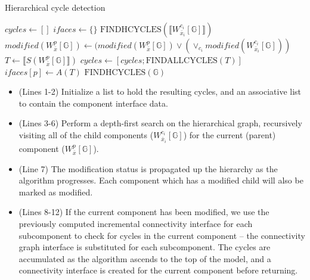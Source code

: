 \begin{algorithm}[H]
\caption{Hierarchical cycle detection}
\label{alg:hcycles}
\begin{algorithmic}[1]
\State $cycles \gets [ ]$
\State $ifaces \gets \{ \}$
      \State ${\scriptstyle \mathrm{FINDHCYCLES}}( \llbracket W_{\bar{x}_i}^{c_i} [\mathbb{G}] \rrbracket )$
   \EndFor
   \State $modified( W_{\bar{x}}^p [\mathbb{G}]) \gets (modified( W_{\bar{x}}^p [\mathbb{G}]) \vee ( \vee_{c_i} modified( W_{\bar{x}_i}^{c_i} [\mathbb{G}] ) )$
      \State $T \gets \llbracket S(W_{\bar{x}}^p [\mathbb{G}] \rrbracket )$
      \State $cycles \gets [ cycles; {\scriptstyle \mathrm{FINDALLCYCLES}}( T ) ]$
      \State $ifaces[p] \gets A(T)$
   \EndIf
\EndFunction
\State ${\scriptstyle \mathrm{FINDHCYCLES}}( \mathbb{G}) $
\end{algorithmic}
\end{algorithm}

\begin{itemize}
\item (Lines 1-2) Initialize a list to hold the resulting cycles, and an associative list to contain the component interface data.
\item (Lines 3-6) Perform a depth-first search on the hierarchical graph, recursively visiting all of the child components ($W_{\bar{x}_i}^{c_i} [\mathbb{G}]$)  for the current (parent) component ($W_{\bar{x}}^p [\mathbb{G}]$).
\item (Line 7)  The modification status is propagated up the hierarchy as the algorithm progresses.  Each component which has a modified child will also be marked as modified.
\item (Lines 8-12) If the current component has been modified, we use the previously computed incremental connectivity interface for each subcomponent to check for cycles in the current component -- the connectivity graph interface is substituted for each subcomponent.  The cycles are accumulated as the algorithm ascends to the top of the model, and a connectivity interface is created for the current component before returning.
\end{itemize}


